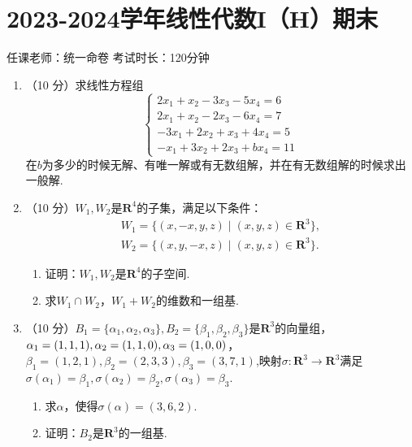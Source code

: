 \section{2023-2024学年线性代数I（H）期末}

\begin{center}
    任课老师：统一命卷\hspace{4em} 考试时长：120分钟
\end{center}

\begin{enumerate}
    \item （10 分）求线性方程组
    \[ \begin{cases}
        2x_1+x_2-3x_3-5x_4=6 \\
        2x_1+x_2-2x_3-6x_4=7 \\
        -3x_1+2x_2+x_3+4x_4=5 \\
        -x_1+3x_2+2x_3+bx_4=11
    \end{cases} \]
    在\(b\)为多少的时候无解、有唯一解或有无数组解，并在有无数组解的时候求出一般解.

    \item （10 分）\(W_1,W_2\)是\(\mathbf{R}^4\)的子集，满足以下条件：
    \begin{gather*}
        W_1=\{(x,-x,y,z)\mid(x,y,z)\in\mathbf{R}^3\}, \\
        W_2=\{(x,y,-x,z)\mid(x,y,z)\in\mathbf{R}^3\}.
    \end{gather*}

    \begin{enumerate}
        \item 证明：\(W_1,W_2\)是\(\mathbf{R}^4\)的子空间.

        \item 求\(W_1\cap W_2\)，\(W_1+W_2\)的维数和一组基.
    \end{enumerate}

    \item （10 分）\(B_1=\{\alpha_1,\alpha_2,\alpha_3\},B_2=\{\beta_1,\beta_2,\beta_3\}\)是\(\mathbf{R}^3\)的向量组，\(\alpha_1=(1,1,1),\alpha_2=(1,1,0),\\\alpha_3=(1,0,0)\)，\(\beta_1=(1,2,1),\beta_2=(2,3,3),\beta_3=(3,7,1)\),映射\(\sigma:\mathbf{R}^3\to\mathbf{R}^3\)满足\(\sigma(\alpha_1)=\beta_1,\sigma(\alpha_2)=\beta_2,\sigma(\alpha_3)=\beta_3\).
    \begin{enumerate}
        \item 求\(\alpha\)，使得\(\sigma(\alpha)=(3,6,2)\).

        \item 证明：\(B_2\)是\(\mathbf{R}^3\)的一组基.


\end{enumerate}
\end{enumerate}
